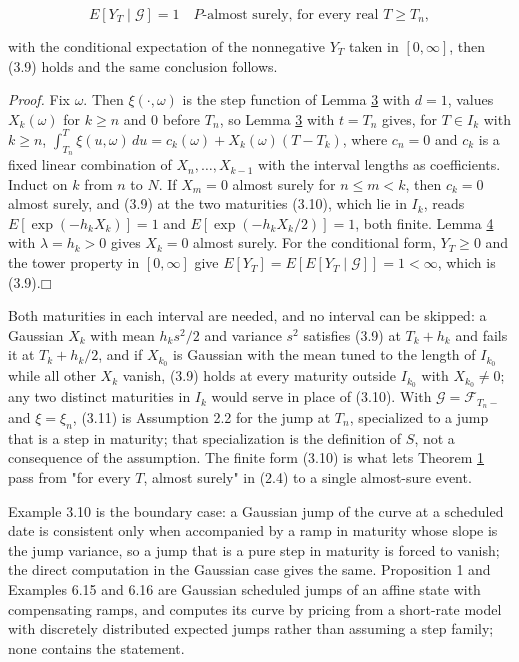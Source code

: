 \documentclass[11pt]{article}
\providecommand{\square}{\mdlgwhtsquare}
\begin{document}
\begin{equation*}
E[Y_T \mid \mathcal G] = 1 \quad P\text{-almost surely, for every real } T \ge T_n, \tag{3.11}\label{eq:3.11}
\end{equation*}

with the conditional expectation of the nonnegative \(Y_T\) taken in \([0, \infty]\), then (3.9) holds and the same conclusion follows.

\emph{Proof.} Fix \(\omega\). Then \(\xi(\cdot, \omega)\) is the step function of Lemma \hyperref[res:Lemma-3]{3} with \(d = 1\), values \(X_k(\omega)\) for \(k \ge n\) and \(0\) before \(T_n\), so Lemma \hyperref[res:Lemma-3]{3} with \(t = T_n\) gives, for \(T \in I_k\) with \(k \ge n\), \(\int_{T_n}^T \xi(u, \omega)\,du = c_k(\omega) + X_k(\omega)(T - T_k)\), where \(c_n = 0\) and \(c_k\) is a fixed linear combination of \(X_n, \dots, X_{k-1}\) with the interval lengths as coefficients. Induct on \(k\) from \(n\) to \(N\). If \(X_m = 0\) almost surely for \(n \le m < k\), then \(c_k = 0\) almost surely, and (3.9) at the two maturities (3.10), which lie in \(I_k\), reads \(E[\exp(-h_k X_k)] = 1\) and \(E[\exp(-h_k X_k / 2)] = 1\), both finite. Lemma \hyperref[res:Lemma-4]{4} with \(\lambda = h_k > 0\) gives \(X_k = 0\) almost surely. For the conditional form, \(Y_T \ge 0\) and the tower property in \([0, \infty]\) give \(E[Y_T] = E[E[Y_T \mid \mathcal G]] = 1 < \infty\), which is (3.9).\hfill$\square$

Both maturities in each interval are needed, and no interval can be skipped: a Gaussian \(X_k\) with mean \(h_k s^2 / 2\) and variance \(s^2\) satisfies (3.9) at \(T_k + h_k\) and fails it at \(T_k + h_k / 2\), and if \(X_{k_0}\) is Gaussian with the mean tuned to the length of \(I_{k_0}\) while all other \(X_k\) vanish, (3.9) holds at every maturity outside \(I_{k_0}\) with \(X_{k_0} \ne 0\); any two distinct maturities in \(I_k\) would serve in place of (3.10). With \(\mathcal G = \mathcal F_{T_n-}\) and \(\xi = \xi_n\), (3.11) is Assumption 2.2 for the jump at \(T_n\), specialized to a jump that is a step in maturity; that specialization is the definition of \(S\), not a consequence of the assumption. The finite form (3.10) is what lets Theorem \hyperref[res:Theorem-1]{1} pass from "for every \(T\), almost surely" in (2.4) to a single almost-sure event.

\cite{fontana2022term} Example 3.10 is the boundary case: a Gaussian jump of the curve at a scheduled date is consistent only when accompanied by a ramp in maturity whose slope is the jump variance, so a jump that is a pure step in maturity is forced to vanish; the direct computation in the Gaussian case gives the same. \cite{kim2014jumps} Proposition 1 and \cite{kellerressel2018affine} Examples 6.15 and 6.16 are Gaussian scheduled jumps of an affine state with compensating ramps, and \cite{backwell2021expected} computes its curve by pricing from a short-rate model with discretely distributed expected jumps rather than assuming a step family; none contains the statement.
\end{document}
